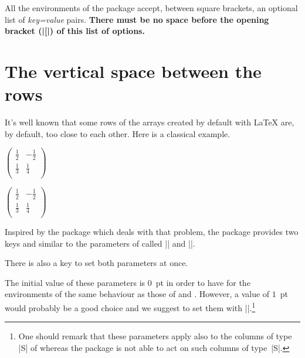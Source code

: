 \documentclass[dvipsnames]{article}%
\begin{document}
\medskip 
All the environments of the package  accept, between square
brackets, an optional list of \textsl{key=value} pairs. \textbf{There must be
no space before the opening bracket (|[|) of this list of options.}


\section{The vertical space between the rows}

\label{cell-space}


It's well known that some rows of the arrays created by default with LaTeX
are, by default, too close to each other. Here is a classical example.

\medskip
\begin{Code}[width=9cm]
$\begin{pmatrix}
\frac{1}{2} & -\frac{1}{2} \\
\frac{1}{3} & \frac{1}{4} \\
\end{pmatrix}$
\end{Code}
$\begin{pmatrix}
\frac{1}{2} & -\frac{1}{2} \\
\frac{1}{3} & \frac{1}{4} \\
\end{pmatrix}$

\bigskip
Inspired by the package  which deals with that problem, the
package  provides two keys  and
 similar to the parameters of
 called |\cellspacetoplimit| and
|\cellspacebottomlimit|.

There is also a key  to set both parameters at
once. 

The initial value of these parameters is $0$~pt in order to have for the
environments of  the same behaviour as those of 
and . However, a value of $1$~pt would probably be a good choice
and we suggest to set them with |\NiceMatrixOptions|.\footnote{One should
remark that these parameters apply also to the columns of type |S| of
 whereas the package  is not able to act on such
columns of type~|S|.}

\medskip
\begin{Code}
\end{Code}
\end{document}
